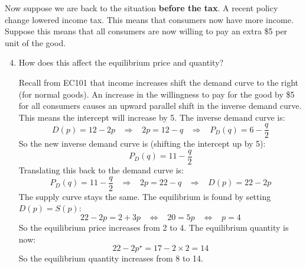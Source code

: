 \documentclass[12pt]{article}
\newcounter{question}[section]
\newenvironment{subquestions}{
  \begin{enumerate}[label=(\roman*)]}{\end{enumerate}}
\begin{document}
Now suppose we are back to the situation \textbf{before the tax}. A recent
policy change lowered income tax. This means that consumers now have more
income. Suppose this means that all consumers are now willing to pay an extra
\$5 per unit of the good.
\begin{subquestions}
  \setcounter{enumi}{3}
  \item How does this affect the equilibrium price and quantity?

    \textcolor{solution-color}{
      Recall from EC101 that income increases shift the demand curve to the right (for normal goods).  An increase in the willingness to pay for the good by \$5 for all consumers causes an upward parallel shift in the inverse demand curve. This means the intercept will increase by 5.
      The inverse demand curve is:
      \[
        D\left( p \right)=12-2p \;\;\;\Longrightarrow \;\;\;
        2p = 12- q \;\;\;\Longrightarrow \;\;\;
        P_D\left( q \right) = 6- \frac{q}{2}
      \]
      So the new inverse demand curve is (shifting the intercept up by 5):
      \[
        P_D\left( q \right) = 11 - \frac{q}{2}
      \]
      Translating this back to the demand curve is:
      \[
        P_D\left( q \right) = 11 - \frac{q}{2} \;\;\;\Longrightarrow \;\;\;
        2p = 22 - q \;\;\;\Longrightarrow \;\;\;
        D\left( p \right)=22-2p
      \]
      The supply curve stays the same. The equilibrium is found by setting
      $D\left( p \right)=S\left( p \right)$:
      \[
        22-2p=2+3p \;\;\; \Longleftrightarrow \;\;\;
        20 = 5p \;\;\; \Longleftrightarrow \;\;\;
        p = 4
      \]
      So the equilibrium price increases from 2 to 4. The equilibrium quantity
      is now:
      \[
        22-2p^\star=17-2\times 2 = 14
      \]
      So the equilibrium quantity increases from 8 to 14.
    }
\end{subquestions}
\end{document}
